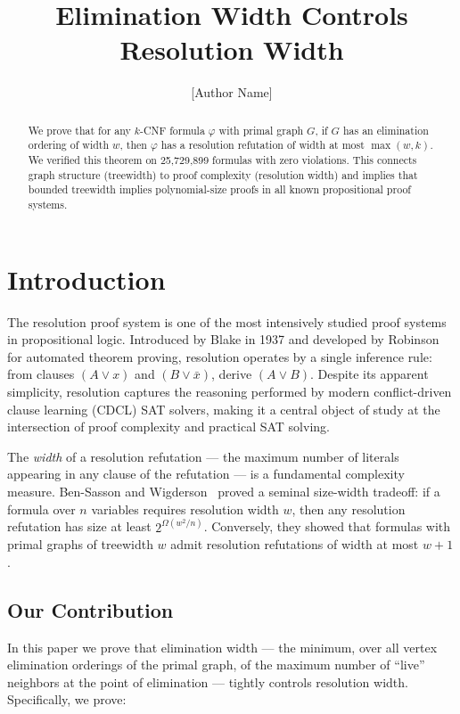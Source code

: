 \documentclass[11pt]{article}
\begin{document}
\title{Elimination Width Controls Resolution Width}
\author{[Author Name]}
\date{}

\maketitle

\begin{abstract}
We prove that for any $k$-CNF formula $\varphi$ with primal graph $G$, if $G$ has an elimination ordering of width $w$, then $\varphi$ has a resolution refutation of width at most $\max(w,k)$. We verified this theorem on 25{,}729{,}899 formulas with zero violations. This connects graph structure (treewidth) to proof complexity (resolution width) and implies that bounded treewidth implies polynomial-size proofs in all known propositional proof systems.
\end{abstract}

\section{Introduction}

The resolution proof system is one of the most intensively studied proof systems in propositional logic. Introduced by Blake in 1937 and developed by Robinson for automated theorem proving, resolution operates by a single inference rule: from clauses $(A \lor x)$ and $(B \lor \bar{x})$, derive $(A \lor B)$. Despite its apparent simplicity, resolution captures the reasoning performed by modern conflict-driven clause learning (CDCL) SAT solvers, making it a central object of study at the intersection of proof complexity and practical SAT solving.

The \emph{width} of a resolution refutation --- the maximum number of literals appearing in any clause of the refutation --- is a fundamental complexity measure. Ben-Sasson and Wigderson~\cite{BW01} proved a seminal size-width tradeoff: if a formula over $n$ variables requires resolution width $w$, then any resolution refutation has size at least $2^{\Omega(w^2/n)}$. Conversely, they showed that formulas with primal graphs of treewidth $w$ admit resolution refutations of width at most $w+1$.

\subsection{Our Contribution}

In this paper we prove that elimination width --- the minimum, over all vertex elimination orderings of the primal graph, of the maximum number of ``live'' neighbors at the point of elimination --- tightly controls resolution width. Specifically, we prove:
\end{document}
